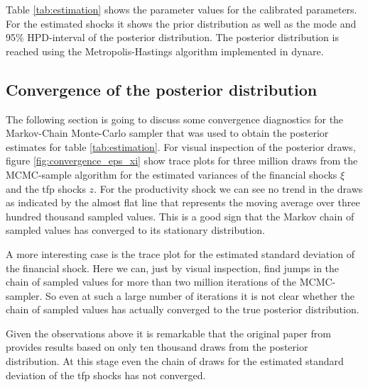 \begin{table}
  \centering
  \caption{Parameterization}
  \label{tab:estimation}
\end{table}

Table \ref{tab:estimation} shows the parameter values for the calibrated
parameters. For the estimated shocks it shows the prior distribution as well as
the mode and 95\% HPD-interval of the posterior distribution. The posterior
distribution is reached using the Metropolis-Hastings algorithm implemented in dynare.

\subsection{Convergence of the posterior distribution}
\label{sec:convergence}

The following section is going to discuss some convergence diagnostics for the
Markov-Chain Monte-Carlo sampler that was used to obtain the posterior
estimates for table \ref{tab:estimation}. For visual inspection of the
posterior draws, figure \ref{fig:convergence_eps_xi} show trace plots for three
million draws from the MCMC-sample algorithm for the estimated variances of the
financial shocks \(\xi\) and the tfp shocks \(z\). For the productivity shock
we can see no trend in the draws as indicated by the almost flat line that
represents the moving average over three hundred thousand sampled values. This
is a good sign that the Markov chain of sampled values has converged to its
stationary distribution.

A more interesting case is the trace plot for the estimated standard deviation
of the financial shock. Here we can, just by visual inspection, find jumps in
the chain of sampled values for more than two million iterations of the
MCMC-sampler. So even at such a large number of iterations it is not clear
whether the chain of sampled values has actually converged to the true
posterior distribution. 

Given the observations above it is remarkable that the original paper from
\textcite{jerman_macroeconomic_2012} provides results based on only ten
thousand draws from the posterior distribution. At this stage even the chain of
draws for the estimated standard deviation of the tfp shocks has not converged.

